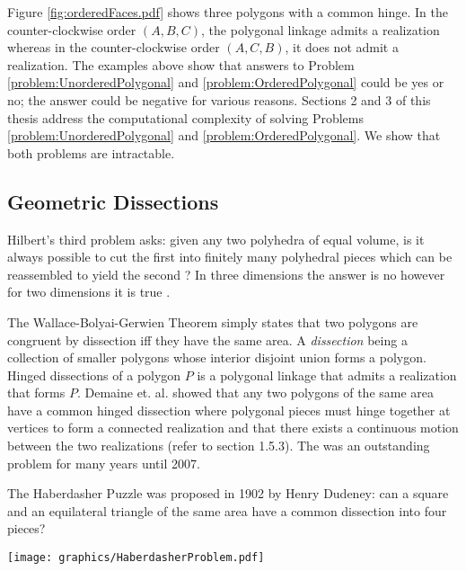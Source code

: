 \documentclass[10pt]{CSUNthesis}
\theoremstyle{plain}%
\theoremstyle{definition}
\theoremstyle{remark}
\begin{document}
Figure \ref{fig:orderedFaces.pdf} shows three polygons with a common hinge.
In the counter-clockwise order $(A,B,C)$, the polygonal linkage admits a realization whereas in the counter-clockwise order $(A,C,B)$, it does not admit a realization.
The examples above show that answers to Problem \ref{problem:UnorderedPolygonal} and \ref{problem:OrderedPolygonal} could be yes or no; the answer could be negative for various reasons.
Sections 2 and 3 of this thesis address the computational complexity of solving Problems \ref{problem:UnorderedPolygonal} and \ref{problem:OrderedPolygonal}.
We show that both problems are intractable.




\subsection{Geometric Dissections}
Hilbert's third problem asks: given any two polyhedra of equal volume, is it always possible to cut the first into finitely many polyhedral pieces which can be reassembled to yield the second \cite{aigner2010hilbert}?  
In three dimensions the answer is no however for two dimensions it is true \cite{10.23073621846}.

The Wallace-Bolyai-Gerwien Theorem simply states that two polygons are congruent by dissection iff they have the same area.  
A \textit{dissection} being a collection of smaller polygons whose interior disjoint union forms a polygon.
Hinged dissections of a polygon $P$ is a polygonal linkage that admits a realization that forms $P$.  
Demaine et. al. \cite{abbott2012hinged} showed that any two polygons of the same area have a common hinged dissection where polygonal pieces must hinge together at vertices to form a connected realization and that there exists a continuous motion between the two realizations (refer to section 1.5.3).
The was an outstanding problem for many years until 2007.

The Haberdasher Puzzle was proposed in 1902 by Henry Dudeney: can a square and an equilateral triangle of the same area have a common dissection into four pieces? 

\begin{minipage}{\linewidth}
\begin{center}
\texttt{[image: graphics/HaberdasherProblem.pdf]}
\end{center}
\label{fig:polygonallinkage-5}
\end{minipage}
\end{document}
